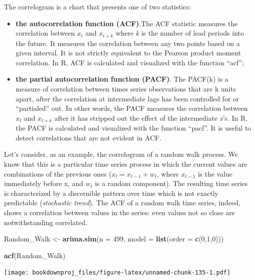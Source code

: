 \documentclass[
]{article}
\newenvironment{Shaded}{\begin{snugshade}}{\end{snugshade}}
\newcommand{\DataTypeTok}[1]{\textcolor[rgb]{0.13,0.29,0.53}{#1}}
\newcommand{\DecValTok}[1]{\textcolor[rgb]{0.00,0.00,0.81}{#1}}
\newcommand{\KeywordTok}[1]{\textcolor[rgb]{0.13,0.29,0.53}{\textbf{#1}}}
\newcommand{\NormalTok}[1]{#1}
\newcommand{\StringTok}[1]{\textcolor[rgb]{0.31,0.60,0.02}{#1}}
\providecommand{\tightlist}{%
  \setlength{\itemsep}{0pt}\setlength{\parskip}{0pt}}
\begin{document}
The correlogram is a chart that presents one of two statistics:

\begin{itemize}
\tightlist
\item
  \textbf{the autocorrelation function (ACF)}.The ACF statistic measures the correlation between \(x_t\) and \(x_{t+k}\) where \emph{k} is the number of lead periods into the future. It measures the correlation between any two points based on a given interval. It is not strictly equivalent to the Pearson product moment correlation. In R, ACF is calculated and visualized with the function ``acf'';
\item
  \textbf{the partial autocorrelation function (PACF)}. The PACF(k) is a measure of correlation between times series observations that are k units apart, after the correlation at intermediate lags has been controlled for or ``partialed'' out. In other words, the PACF measures the correlation between \(x_t\) and \(x_{t+k}\) after it has stripped out the effect of the intermediate \emph{x}'s. In R, the PACF is calculated and visualized with the function ``pacf''. It is useful to detect correlations that are not evident in ACF.
\end{itemize}

Let's consider, as an example, the correlogram of a random walk process. We know that this is a particular time series process in which the current values are combinations of the previous ones (\(x_t = x_{t-1} + w_t\), where \(x_{t-1}\) is the value immediately before x, and \(w_t\) is a random component). The resulting time series is characterized by a discernible pattern over time which is not exactly predictable (\emph{stochastic trend}). The ACF of a random walk time series, indeed, shows a correlation between values in the series: even values not so close are notwithstanding correlated.

\begin{Shaded}
\begin{Highlighting}[]
\NormalTok{Random_Walk <-}\StringTok{ }\KeywordTok{arima.sim}\NormalTok{(}\DataTypeTok{n =} \DecValTok{499}\NormalTok{, }\DataTypeTok{model =} \KeywordTok{list}\NormalTok{(}\DataTypeTok{order =} \KeywordTok{c}\NormalTok{(}\DecValTok{0}\NormalTok{,}\DecValTok{1}\NormalTok{,}\DecValTok{0}\NormalTok{)))}

\KeywordTok{acf}\NormalTok{(Random_Walk)}
\end{Highlighting}
\end{Shaded}

\texttt{[image: bookdownproj\_files/figure-latex/unnamed-chunk-135-1.pdf]}
\end{document}
